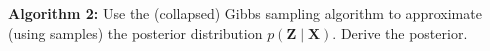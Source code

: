 \textbf{Algorithm 2:} Use the (collapsed) Gibbs sampling algorithm to approximate (using samples) the posterior distribution $p(\boldsymbol{Z} \mid \boldsymbol{X})$. Derive the posterior. \\\\